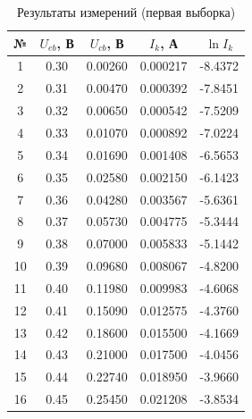 \begin{table}[h]
\centering
\caption{Результаты измерений (первая выборка)}
\label{tab:data1}
\begin{tabular}{|c|c|c|c|c|}
\hline
№ & $U_{eb}$, В & $U_{cb}$, В & $I_k$, А & $\ln I_k$ \\
\hline
1 & 0.30 & 0.00260 & 0.000217 & -8.4372 \\
2 & 0.31 & 0.00470 & 0.000392 & -7.8451 \\
3 & 0.32 & 0.00650 & 0.000542 & -7.5209 \\
4 & 0.33 & 0.01070 & 0.000892 & -7.0224 \\
5 & 0.34 & 0.01690 & 0.001408 & -6.5653 \\
6 & 0.35 & 0.02580 & 0.002150 & -6.1423 \\
7 & 0.36 & 0.04280 & 0.003567 & -5.6361 \\
8 & 0.37 & 0.05730 & 0.004775 & -5.3444 \\
9 & 0.38 & 0.07000 & 0.005833 & -5.1442 \\
10 & 0.39 & 0.09680 & 0.008067 & -4.8200 \\
11 & 0.40 & 0.11980 & 0.009983 & -4.6068 \\
12 & 0.41 & 0.15090 & 0.012575 & -4.3760 \\
13 & 0.42 & 0.18600 & 0.015500 & -4.1669 \\
14 & 0.43 & 0.21000 & 0.017500 & -4.0456 \\
15 & 0.44 & 0.22740 & 0.018950 & -3.9660 \\
16 & 0.45 & 0.25450 & 0.021208 & -3.8534 \\
\hline
\end{tabular}
\end{table}
